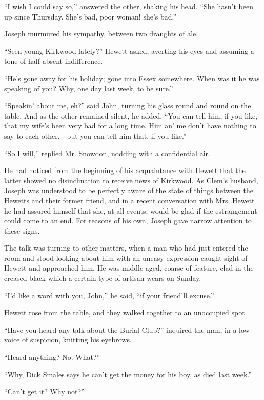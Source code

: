 ``I wish I could say so,'' answered the other, shaking his head. ``She
hasn't been up since Thursday. She's bad, poor woman! she's bad.''

Joseph murmured his sympathy, between two draughts of ale.

``Seen young Kirkwood lately?'' Hewett asked, averting his eyes and
assuming a tone of half-absent indifference.

``He's gone away for his holiday; gone into
{\protect\hypertarget{156}{}{}}Essex somewhere. When was it he was
speaking of you? Why, one day last week, to be sure.''

``Speakin' about me, eh?'' said John, turning his glass round and round
on the table. And as the other remained silent, he added, ``You can tell
him, if you like, that my wife's been very bad for a long time. Him an'
me don't have nothing to say to each other,---but you can tell him that,
if you like.''

``So I will,'' replied Mr. Snowdon, nodding with a confidential air.

He had noticed from the beginning of his acquaintance with Hewett that
the latter showed no disinclination to receive news of Kirkwood. As
Clem's husband, Joseph was understood to be perfectly aware of the state
of things between the Hewetts and their former friend, and in a recent
conversation with Mrs. Hewett he had assured himself that she, at all
events, would be glad if the estrangement could come to an end. For
reasons of his own, Joseph gave narrow attention to these signs.

{\protect\hypertarget{157}{}{}}The talk was turning to other matters,
when a man who had just entered the room and stood looking about him
with an uneasy expression caught sight of Hewett and approached him. He
was middle-aged, coarse of feature, clad in the creased black which a
certain type of artisan wears on Sunday.

``I'd like a word with you, John,'' he said, ``if your friend'll
excuse.''

Hewett rose from the table, and they walked together to an unoccupied
spot.

``Have you heard any talk about the Burial Club?'' inquired the man, in
a low voice of suspicion, knitting his eyebrows.

``Heard anything? No. What?''

``Why, Dick Smales says he can't get the money for his boy, as died last
week.''

``Can't get it? Why not?''


